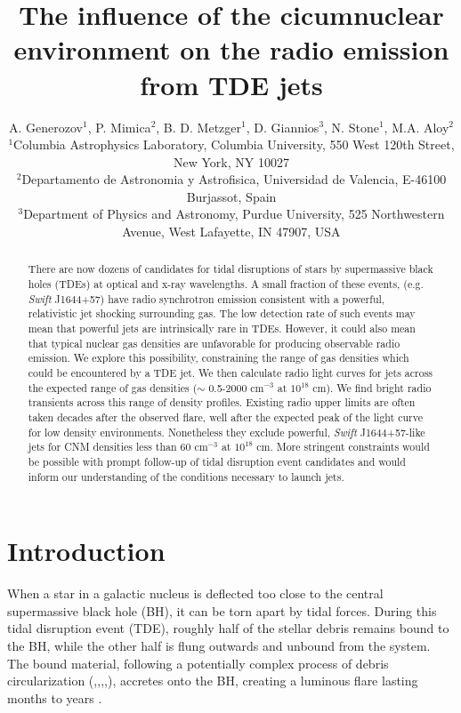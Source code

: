 \documentclass[usenatbib,fleqn]{mnras}
\title[Influence of CNM on TDE radio emission]{The influence of the
  cicumnuclear environment on the radio emission from TDE jets}
\author[Generozov et al.]{ A. Generozov$^{1}$, P. Mimica$^{2}$,
  B. D. Metzger$^{1}$, D. Giannios$^{3}$, N. Stone$^{1}$,
  M.A. Aloy$^{2}$
  \\
  $^{1}$Columbia Astrophysics Laboratory, Columbia University, 550 West 120th Street, New York, NY 10027\\
  $^{2}$Departamento de Astronomia y Astrofisica, Universidad de Valencia, E-46100 Burjassot, Spain\\
  $^{3}$Department of Physics and Astronomy, Purdue University, 525
  Northwestern Avenue, West Lafayette, IN 47907, USA}
\begin{document}
\maketitle
\begin{abstract}
  There are now dozens of candidates for tidal disruptions of stars by
  supermassive black holes (TDEs) at optical and x-ray wavelengths. A
  small fraction of these events, (e.g. {\it Swift} J1644+57) have radio
  synchrotron emission consistent with a powerful, relativistic jet
  shocking surrounding gas. The low detection rate of such events may
  mean that powerful jets are intrinsically rare in TDEs. However, it
  could also mean that typical nuclear gas densities are unfavorable
  for producing observable radio emission. We explore this
  possibility, constraining the range of gas densities which could be
  encountered by a TDE jet. We then calculate radio light curves for
  jets across the expected range of gas densities ($\sim$ 0.5-2000
  cm$^{-3}$ at $10^{18}$ cm). We find bright radio transients across
  this range of density profiles. Existing radio upper limits are
  often taken decades after the observed flare, well after the
  expected peak of the light curve for low density
  environments. Nonetheless they exclude powerful, {\it Swift} J1644+57-like
  jets for CNM densities less than 60 cm$^{-3}$ at $10^{18}$ cm. More
  stringent constraints would be possible with prompt follow-up of
  tidal disruption event candidates and would inform our understanding
  of the conditions necessary to launch jets.
\end{abstract}
\section{Introduction}
\label{sec:intro}
When a star in a galactic nucleus is deflected too close to the
central supermassive black hole (BH), it can be torn apart by tidal
forces.  During this tidal disruption event (TDE), roughly half of the
stellar debris remains bound to the BH, while the other half is flung
outwards and unbound from the system.  The bound material, following a
potentially complex process of debris circularization
(\citealt{Guillochon+2013},\citealt{Hayasaki+2013},\citealt{Hayasaki+2015},\citealt{Shiokawa+2015},\citealt{Bonnerot+2015}),
accretes onto the BH, creating a luminous flare lasting months to
years \citep{Hills1975, Carter+1982, Rees1988}.
\end{document}
